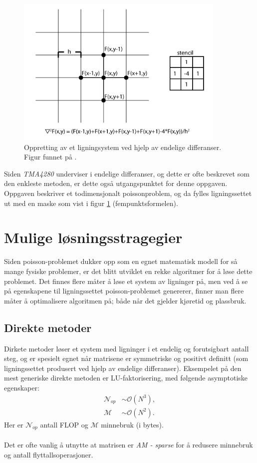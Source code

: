 \documentclass{article}
\begin{document}
\begin{figure}[t]
	\label{fig:finite-difference}
	\centering
	\includegraphics[width=10cm]{img/finite-difference.png}	
	\caption{Oppretting av et ligningsystem ved hjelp av endelige differanser. Figur funnet på \cite{rdw}. }
	
\end{figure}

Siden \emph{TMA4280} underviser i endelige differanser, og dette er ofte beskrevet som den enkleste metoden, er dette også utgangspunktet for denne oppgaven. Oppgaven beskriver et todimensjonalt poissonproblem, og da fylles ligningssettet ut med en maske som vist i figur \ref{fig:finite-difference} (fempunktsformelen).

\section{Mulige løsningsstragegier}
Siden poisson-problemet dukker opp som en egnet matematisk modell for så mange fysiske problemer, er det blitt utviklet en rekke algoritmer for å løse dette problemet. Det finnes flere måter å løse et system av ligninger på, men ved å se på egenskapene til ligningssettet poisson-problemet genererer, finner man flere måter å optimalisere algoritmen på; både når det gjelder kjøretid og plassbruk.
\subsection{Direkte metoder}
Dirkete metoder løser et system med ligninger i et endelig og forutsigbart antall steg, og er spesielt egnet når matrisene er symmetriske og positivt definitt (som ligningssettet produsert ved hjelp av endelige differanser). Eksempelet på den mest generiske direkte metoden er LU-faktorisering, med følgende asymptotiske egenskaper:
\begin{align*}
      \mathcal{N}_{op} &\sim \mathcal{O}(N^3), \\
      \mathcal{M} &\sim \mathcal{O}(N^2).
\end{align*}
Her er $\mathcal{N}_{op}$ antall FLOP og $\mathcal{M}$ minnebruk (i bytes).\\
\\
Det er ofte vanlig å utnytte at matrisen er \emph{AM - sparse} for å redusere minnebruk og antall flyttallsoperasjoner.
\end{document}
